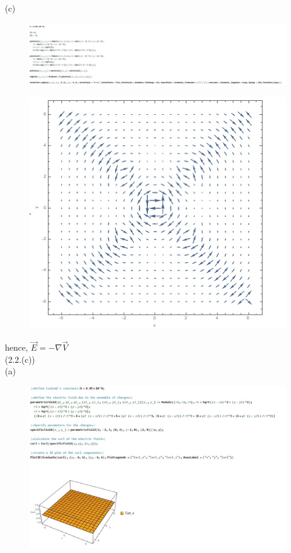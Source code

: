 \documentclass[journal,12pt,onecolumn]{IEEEtran}
\theoremstyle{remark}
\begin{document}
 (c)\begin{figure}[H]
    \centering
     \includegraphics[scale=0.55]{figs/e.1.1.jpeg}
    \caption{}    
    \label{fig:ishitha.em.fig1}
   \end{figure} \begin{figure}[H]
    \centering
     \includegraphics[scale=0.5]{figs/e.1.jpeg}
    \caption{}    
    \label{fig:ishitha.em.fig1}
   \end{figure}
 hence, $\overrightarrow{E}=-\nabla\overrightarrow{V}  $    \\ 
 \newpage
(2.2.(c))\\
(a)
\begin{figure}[H]
    \centering
     \includegraphics[scale=0.5]{figs/c1.jpeg}
    \caption{}    
    \label{fig:ishitha.em.fig1}
   \end{figure} 
  
\end{document}
